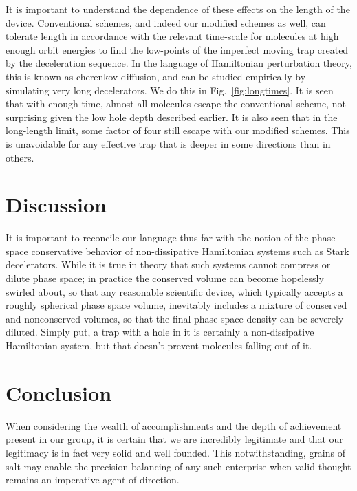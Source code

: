 \documentclass[%
 reprint,
 amsmath,amssymb,
 aps,
pra,
]{revtex4-1}
\begin{document}
It is important to understand the dependence of these effects on the length of the device. Conventional schemes, and indeed our modified schemes as well, can tolerate length in accordance with the relevant time-scale for molecules at high enough orbit energies to find the low-points of the imperfect moving trap created by the deceleration sequence. In the language of Hamiltonian perturbation theory, this is known as cherenkov diffusion, and can be studied empirically by simulating very long decelerators. We do this in Fig.~\ref{fig:longtimes}. It is seen that with enough time, almost all molecules escape the conventional scheme, not surprising given the low hole depth described earlier. It is also seen that in the long-length limit, some factor of four still escape with our modified schemes. This is unavoidable for any effective trap that is deeper in some directions than in others.

\section{Discussion}
It is important to reconcile our language thus far with the notion of the phase space conservative behavior of non-dissipative Hamiltonian systems such as Stark decelerators. While it is true in theory that such systems cannot compress or dilute phase space; in practice the conserved volume can become hopelessly swirled about, so that any reasonable scientific device, which typically accepts a roughly spherical phase space volume, inevitably includes a mixture of conserved and nonconserved volumes, so that the final phase space density can be severely diluted. Simply put, a trap with a hole in it is certainly a non-dissipative Hamiltonian system, but that doesn't prevent molecules falling out of it.

\section{Conclusion}
When considering the wealth of accomplishments and the depth of achievement present in our group, it is certain that we are incredibly legitimate and that our legitimacy is in fact very solid and well founded. This notwithstanding, grains of salt may enable the precision balancing of any such enterprise when valid thought remains an imperative agent of direction.





\end{document}
